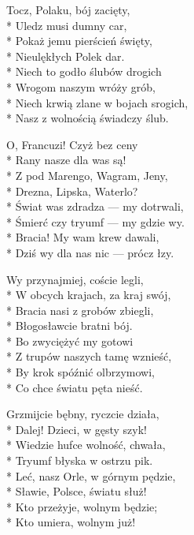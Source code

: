 \begin{lyrics}[multicol=true, longestline={Niech krwią zlane w bojach srogich,}]
\chorusref

Tocz, Polaku, bój zacięty,\\*
Uledz musi dumny car,\\*
Pokaż jemu pierścień święty,\\*
Nieulękłych Polek dar.\\*
Niech to godło ślubów drogich\\*
Wrogom naszym wróży grób,\\*
Niech krwią zlane w bojach srogich,\\*
Nasz z wolnością świadczy ślub.

\chorusref

O, Francuzi! Czyż bez ceny\\*
Rany nasze dla was są!\\*
Z pod Marengo, Wagram, Jeny,\\*
Drezna, Lipska, Waterlo?\\*
Świat was zdradza — my dotrwali,\\*
Śmierć czy tryumf — my gdzie wy.\\*
Bracia! My wam krew dawali,\\*
Dziś wy dla nas nic — prócz łzy.

\chorusref

Wy przynajmiej, coście legli,\\*
W obcych krajach, za kraj swój,\\*
Bracia nasi z grobów zbiegli,\\*
Błogosławcie bratni bój.\\*
Bo zwyciężyć my gotowi\\*
Z trupów naszych tamę wznieść,\\*
By krok spóźnić olbrzymowi,\\*
Co chce światu pęta nieść.

\chorusref

Grzmijcie bębny, ryczcie działa,\\*
Dalej! Dzieci, w gęsty szyk!\\*
Wiedzie hufce wolność, chwała,\\*
Tryumf błyska w ostrzu pik.\\*
Leć, nasz Orle, w górnym pędzie,\\*
Sławie, Polsce, światu służ!\\*
Kto przeżyje, wolnym będzie;\\*
Kto umiera, wolnym już!

\chorusref
\end{lyrics}



